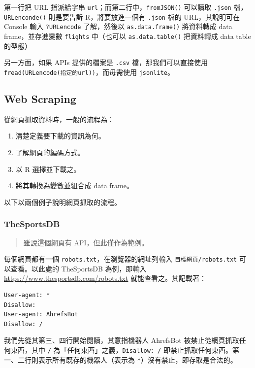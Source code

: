 \documentclass[
]{book}
\providecommand{\tightlist}{%
  \setlength{\itemsep}{0pt}\setlength{\parskip}{0pt}}
\theoremstyle{definition}
\theoremstyle{remark}
\begin{document}
第一行把 URL 指派給字串 \texttt{url}；而第二行中，\texttt{fromJSON()} 可以讀取 \texttt{.json} 檔，\texttt{URLenconde()} 則是要告訴 R，將要放進一個有 \texttt{.json} 檔的 URL，其說明可在 Console 輸入 \texttt{?URLencode} 了解，然後以 \texttt{as.data.frame()} 將資料轉成 data frame，並存進變數 \texttt{flights} 中（也可以 \texttt{as.data.table()} 把資料轉成 data table 的型態）

另一方面，如果 APIs 提供的檔案是 \texttt{.csv} 檔，那我們可以直接使用 \texttt{fread(URLencode(指定的url))}，而毋需使用 \texttt{jsonlite}。

\hypertarget{web-scraping}{%
\subsection{Web Scraping}\label{web-scraping}}

從網頁抓取資料時，一般的流程為：

\begin{enumerate}
\def\labelenumi{\arabic{enumi}.}
\tightlist
\item
  清楚定義要下載的資訊為何。
\item
  了解網頁的編碼方式。
\item
  以 R 選擇並下載之。
\item
  將其轉換為變數並組合成 data frame。
\end{enumerate}

以下以兩個例子說明網頁抓取的流程。

\hypertarget{thesportsdb}{%
\subsubsection{TheSportsDB}\label{thesportsdb}}

\begin{quote}
雖說這個網頁有 API，但此僅作為範例。
\end{quote}

每個網頁都有一個 \texttt{robots.txt}，在瀏覽器的網址列輸入 \texttt{目標網頁/robots.txt} 可以查看。以此處的 TheSportsDB 為例，即輸入 \url{https://www.thesportsdb.com/robots.txt} 就能查看之。其記載著：

\begin{verbatim}
User-agent: *
Disallow:
User-agent: AhrefsBot
Disallow: /
\end{verbatim}

我們先從其第三、四行開始閱讀，其意指機器人 AhrefsBot 被禁止從網頁抓取任何東西，其中 \texttt{/} 為「任何東西」之義，\texttt{Disallow:\ /} 即禁止抓取任何東西。第一、二行則表示所有既存的機器人（表示為 \texttt{*}）沒有禁止，即存取是合法的。
\end{document}
